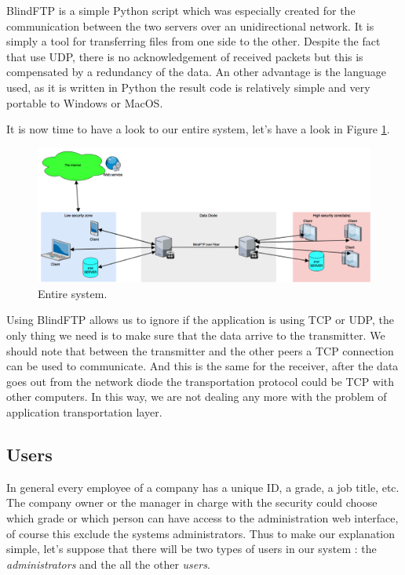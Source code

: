 \documentclass[a4paper,10pt]{article}
\begin{document}
BlindFTP is a simple Python script which was especially created for the communication between the two servers over an unidirectional network. It is simply a tool for transferring files from one side to the other. Despite the fact that use UDP, there is no acknowledgement of received packets but this is compensated by a redundancy of the data. An other advantage is the language used, as it is written in Python the result code is relatively simple and very portable to Windows or MacOS.

It is now time to have a look to our entire system, let's have a look in Figure \ref{fig:sysschem}.\bigskip

\begin{figure}
\centering
\includegraphics[scale=0.35]{images/systemschema.png}
\caption{Entire system.}
\label{fig:sysschem}
\end{figure}

Using BlindFTP allows us to ignore if the application is using TCP or UDP, the only thing we need is to make sure that the data arrive to the transmitter. We should note that between the transmitter and the other peers a TCP connection can be used to communicate. And this is the same for the receiver, after the data goes out from the network diode the transportation protocol could be TCP with other computers. In this way, we are not dealing any more with the problem of application transportation layer. 

\subsection{Users} 
In general every employee of a company has a unique ID, a grade, a job title, etc. The company owner or the manager in charge with the security could choose which grade or which person can have access to the administration web interface, of course this exclude the systems administrators.  Thus to make our explanation simple, let's suppose that there will be two types of users in our system : the \textit{administrators} and the all the other \textit{users}.
\end{document}
